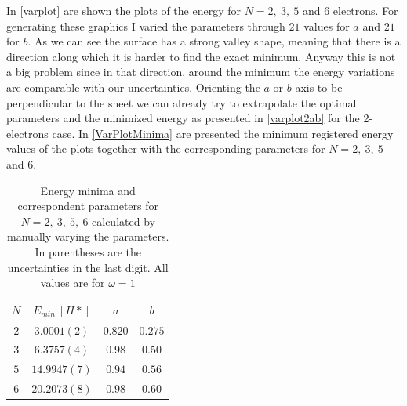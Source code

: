 In \autoref{varplot} are shown the plots of the energy for $N=2,\>3,\>5$ and $6$ electrons.
For generating these graphics I varied the parameters through $21$ values for $a$ and $21$ for $b$.
As we can see the surface has a strong valley shape, meaning that there is a direction along which it is harder to find the exact minimum.
Anyway this is not a big problem since in that direction, around the minimum the energy variations are comparable with our uncertainties.
Orienting the $a$ or $b$ axis to be perpendicular to the sheet we can already try to extrapolate the optimal parameters and the minimized energy as presented in \autoref{varplot2ab} for the 2-electrons case.
In \autoref{VarPlotMinima} are presented the minimum registered energy values of the plots together with the corresponding parameters for $N=2,\>3,\>5$ and $6$.

\begin{table}[H]
  \centering
  \begin{tabular}{c|c|c|c}
    \toprule
    $N$ & $E_{min}\>[H*]$ & $a$ & $b$ \\
    \hline
    $2$ & $3.0001(2)$ & $0.820$ & $0.275$ \\
    $3$ & $6.3757(4)$ & $0.98$ & $0.50$ \\
    $5$ & $14.9947(7)$ & $0.94$ & $0.56$ \\
    $6$ & $20.2073(8)$ & $0.98$ & $0.60$ \\
    \bottomrule
  \end{tabular}
  \caption[Energy minima and correspondent parameters for $N=2,\>3,\>5,\>6$ calculated by manually varying the parameters.]{Energy minima and correspondent parameters for $N=2,\>3,\>5,\>6$ calculated by manually varying the parameters. In parentheses are the uncertainties in the last digit. All values are for $\omega=1$}
  \label{VarPlotMinima}
\end{table}

